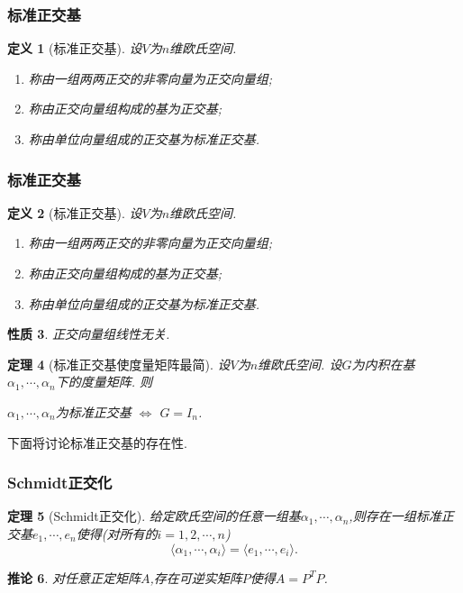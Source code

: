 \documentclass{article}
\newtheorem{theorem}{定理}  %
\newtheorem{proposition}[theorem]{性质}  %
\newtheorem{definition}[theorem]{定义}
\newtheorem{corollary}[theorem]{推论}
\renewcommand{\blue }[1]{{\textcolor[rgb]{0,0,1}{#1}}}
\begin{document}
\subsubsection{标准正交基}
\begin{definition}[标准正交基]
设$V$为$n$维欧氏空间.
\begin{enumerate}
\item 称由一组两两正交的非零向量为\blue{正交向量组};
\item 称由正交向量组构成的基为\blue{正交基};
\item 称由单位向量组成的正交基为\blue{标准正交基}.
\end{enumerate}
\end{definition}

\subsubsection{标准正交基}
\begin{definition}[标准正交基]
设$V$为$n$维欧氏空间.
\begin{enumerate}
\item 称由一组两两正交的非零向量为\blue{正交向量组};
\item 称由正交向量组构成的基为\blue{正交基};
\item 称由单位向量组成的正交基为\blue{标准正交基}.
\end{enumerate}
\end{definition}
\begin{proposition}
正交向量组线性无关.
\end{proposition}
\begin{theorem}[标准正交基使度量矩阵最简]
设$V$为$n$维欧氏空间. 设$G$为内积在基$\alpha_1,\cdots,\alpha_n$下的度量矩阵.
则
\begin{center}
$\alpha_1,\cdots,\alpha_n$为标准正交基 \quad $\Leftrightarrow$ \quad $G=I_n$.
\end{center}
\end{theorem}
下面将讨论标准正交基的存在性.

\subsubsection{Schmidt正交化}
\begin{theorem}[Schmidt正交化]
给定欧氏空间的任意一组基$\alpha_1,\cdots,\alpha_n$,则存在一组标准正交基$e_1,\cdots,e_n$使得(对所有的$i=1,2,\cdots,n$)
\[\langle\alpha_1,\cdots,\alpha_i\rangle = \langle e_1,\cdots,e_i\rangle.\]
\end{theorem}
\begin{corollary}
对任意正定矩阵$A$,存在可逆实矩阵$P$使得$A=P^TP$.
\end{corollary}
\end{document}
